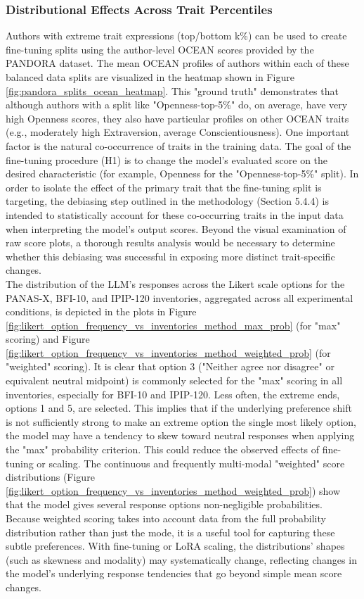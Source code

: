 \documentclass{DESSThesis}
\begin{document}
\subsubsection{Distributional Effects Across Trait Percentiles}
Authors with extreme trait expressions (top/bottom k\%) can be used to create fine-tuning splits using the author-level OCEAN scores provided by the PANDORA dataset. The mean OCEAN profiles of authors within each of these balanced data splits are visualized in the heatmap shown in Figure \ref{fig:pandora_splits_ocean_heatmap}. This "ground truth" demonstrates that although authors with a split like "Openness-top-5\%" do, on average, have very high Openness scores, they also have particular profiles on other OCEAN traits (e.g., moderately high Extraversion, average Conscientiousness). One important factor is the natural co-occurrence of traits in the training data. The goal of the fine-tuning procedure (H1) is to change the model's evaluated score on the desired characteristic (for example, Openness for the "Openness-top-5\%" split). In order to isolate the effect of the primary trait that the fine-tuning split is targeting, the debiasing step outlined in the methodology (Section 5.4.4) is intended to statistically account for these co-occurring traits in the input data when interpreting the model's output scores. Beyond the visual examination of raw score plots, a thorough results analysis would be necessary to determine whether this debiasing was successful in exposing more distinct trait-specific changes.
\\
The distribution of the LLM's responses across the Likert scale options for the PANAS-X, BFI-10, and IPIP-120 inventories, aggregated across all experimental conditions, is depicted in the plots in Figure \ref{fig:likert_option_frequency_vs_inventories_method_max_prob} (for "max" scoring) and Figure \ref{fig:likert_option_frequency_vs_inventories_method_weighted_prob} (for "weighted" scoring). It is clear that option 3 ("Neither agree nor disagree" or equivalent neutral midpoint) is commonly selected for the "max" scoring in all inventories, especially for BFI-10 and IPIP-120. Less often, the extreme ends, options 1 and 5, are selected. This implies that if the underlying preference shift is not sufficiently strong to make an extreme option the single most likely option, the model may have a tendency to skew toward neutral responses when applying the "max" probability criterion. This could reduce the observed effects of fine-tuning or scaling. The continuous and frequently multi-modal "weighted" score distributions (Figure \ref{fig:likert_option_frequency_vs_inventories_method_weighted_prob}) show that the model gives several response options non-negligible probabilities. Because weighted scoring takes into account data from the full probability distribution rather than just the mode, it is a useful tool for capturing these subtle preferences. With fine-tuning or LoRA scaling, the distributions' shapes (such as skewness and modality) may systematically change, reflecting changes in the model's underlying response tendencies that go beyond simple mean score changes.
\end{document}
